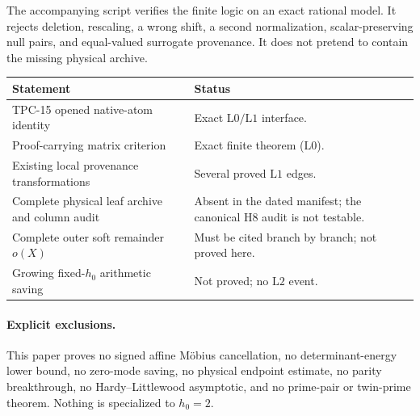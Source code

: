 \documentclass[11pt,a4paper]{article}
\theoremstyle{definition}
\theoremstyle{remark}
\newcommand{\Lzero}{\mathrm{L0}}
\newcommand{\Lone}{\mathrm{L1}}
\newcommand{\Ltwo}{\mathrm{L2}}
\begin{document}
The accompanying script verifies the finite logic on an exact rational
model.  It rejects deletion, rescaling, a wrong shift, a second
normalization, scalar-preserving null pairs, and equal-valued surrogate
provenance.  It does not pretend to contain the missing physical
archive.

\begin{center}
\small
\begin{tabularx}{\textwidth}{@{}p{}X@{}}
\toprule
Statement & Status\\
\midrule
TPC-15 opened native-atom identity
& Exact \(\Lzero/\Lone\) interface.\\
Proof-carrying matrix criterion
& Exact finite theorem (\(\Lzero\)).\\
Existing local provenance transformations
& Several proved \(\Lone\) edges.\\
Complete physical leaf archive and column audit
& Absent in the dated manifest; the canonical H8 audit is not
testable.\\
Complete outer soft remainder \(o(X)\)
& Must be cited branch by branch; not proved here.\\
Growing fixed-\(h_0\) arithmetic saving
& Not proved; no \(\Ltwo\) event.\\
\bottomrule
\end{tabularx}
\end{center}

\paragraph{Explicit exclusions.}
This paper proves no signed affine M\"obius cancellation, no
determinant-energy lower bound, no zero-mode saving, no physical
endpoint estimate, no parity breakthrough, no Hardy--Littlewood
asymptotic, and no prime-pair or twin-prime theorem.  Nothing is
specialized to \(h_0=2\).

\begingroup
\scriptsize
\setlength{\bibsep}{1pt}
\raggedright


\endgroup
\end{document}

